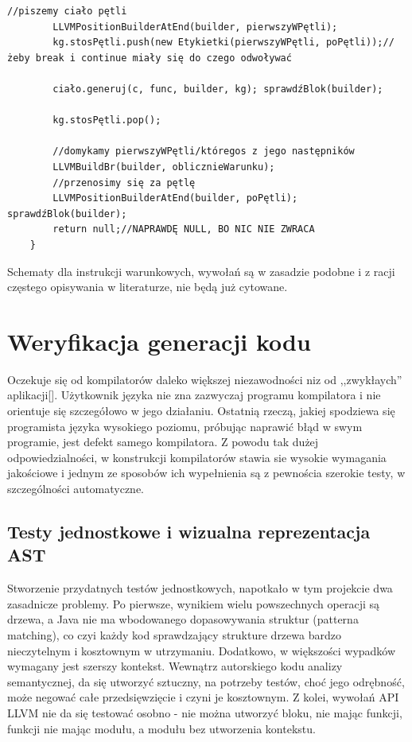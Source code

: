 \begin{lstlisting}[basicstyle=\scriptsize]
        //piszemy ciało pętli
        LLVMPositionBuilderAtEnd(builder, pierwszyWPętli);
        kg.stosPętli.push(new Etykietki(pierwszyWPętli, poPętli));//żeby break i continue miały się do czego odwoływać

        ciało.generuj(c, func, builder, kg); sprawdźBlok(builder);

        kg.stosPętli.pop();

        //domykamy pierwszyWPętli/któregos z jego następników
        LLVMBuildBr(builder, oblicznieWarunku);
        //przenosimy się za pętlę
        LLVMPositionBuilderAtEnd(builder, poPętli); sprawdźBlok(builder);
        return null;//NAPRAWDĘ NULL, BO NIC NIE ZWRACA
    }
\end{lstlisting}

Schematy dla instrukcji warunkowych, wywołań są w zasadzie podobne i z racji częstego opisywania w literaturze, nie będą już cytowane.


\section{Weryfikacja generacji kodu}
Oczekuje się od kompilatorów daleko większej niezawodności niz od ,,zwykłaych'' aplikacji[]. Użytkownik języka nie zna zazwyczaj programu kompilatora i nie orientuje się szczegółowo w jego działaniu. Ostatnią rzeczą, jakiej spodziewa się programista języka wysokiego poziomu, próbując naprawić błąd w swym programie, jest defekt samego kompilatora. Z powodu tak dużej odpowiedzialności, w konstrukcji kompilatorów stawia sie wysokie wymagania jakościowe i jednym ze sposobów ich wypełnienia są z pewnościa szerokie testy, w szczególności automatyczne.

\subsection{Testy jednostkowe i wizualna reprezentacja AST}
Stworzenie przydatnych testów jednostkowych, napotkało w tym projekcie dwa zasadnicze problemy. Po pierwsze, wynikiem wielu powszechnych operacji są drzewa, a Java nie ma wbodowanego dopasowywania struktur (patterna matching), co czyi każdy kod sprawdzający strukture drzewa bardzo nieczytelnym i kosztownym w utrzymaniu. Dodatkowo, w większości wypadków wymagany jest szerszy kontekst. Wewnątrz autorskiego kodu analizy semantycznej, da się utworzyć sztuczny, na potrzeby testów, choć jego odrębność, może negować całe przedsięwzięcie i czyni je kosztownym. Z kolei, wywołań API LLVM nie da się testować osobno - nie można utworzyć bloku, nie mając funkcji, funkcji nie mając modułu, a modułu bez utworzenia kontekstu.

